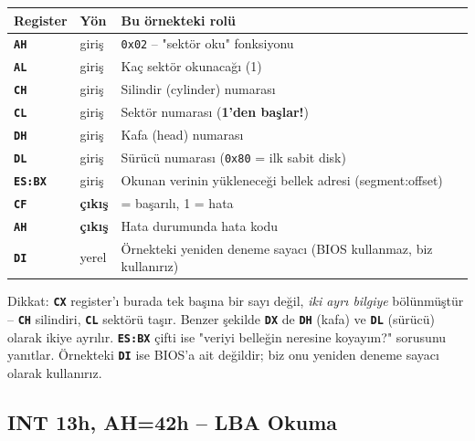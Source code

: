 \documentclass[11pt,a4paper]{article}
\newcommand{\reg}[1]{\texttt{\color{anaMavi}\textbf{#1}}}
\newcommand{\hx}[1]{\texttt{\color{turuncu}#1}}
\begin{document}
\begin{center}
\small
\begin{tabularx}{\textwidth}{@{}l l >{\raggedright\arraybackslash}X@{}}
\toprule
\rowcolor{anaMavi}\color{white}\textbf{Register} & \color{white}\textbf{Yön} & \color{white}\textbf{Bu örnekteki rolü} \\
\midrule
\reg{AH} & giriş & \hx{0x02} -- "sektör oku" fonksiyonu \\
\rowcolor{acikGri} \reg{AL} & giriş & Kaç sektör okunacağı (1) \\
\reg{CH} & giriş & Silindir (cylinder) numarası \\
\rowcolor{acikGri} \reg{CL} & giriş & Sektör numarası (\textbf{1'den başlar!}) \\
\reg{DH} & giriş & Kafa (head) numarası \\
\rowcolor{acikGri} \reg{DL} & giriş & Sürücü numarası (\hx{0x80} = ilk sabit disk) \\
\reg{ES:BX} & giriş & Okunan verinin yükleneceği bellek adresi (segment:offset) \\
\rowcolor{acikGri} \reg{CF} & \textbf{çıkış} & 0 = başarılı, 1 = hata \\
\reg{AH} & \textbf{çıkış} & Hata durumunda hata kodu \\
\reg{DI} & yerel & Örnekteki yeniden deneme sayacı (BIOS kullanmaz, biz kullanırız) \\
\bottomrule
\end{tabularx}
\end{center}

\begin{ipucukutu}
Dikkat: \reg{CX} register'ı burada tek başına bir sayı değil, \emph{iki ayrı
bilgiye} bölünmüştür -- \reg{CH} silindiri, \reg{CL} sektörü taşır. Benzer
şekilde \reg{DX} de \reg{DH} (kafa) ve \reg{DL} (sürücü) olarak ikiye ayrılır.
\reg{ES:BX} çifti ise "veriyi belleğin neresine koyayım?" sorusunu yanıtlar.
Örnekteki \reg{DI} ise BIOS'a ait değildir; biz onu yeniden deneme sayacı
olarak kullanırız.
\end{ipucukutu}

\subsection{INT 13h, AH=42h -- LBA Okuma}
\end{document}
